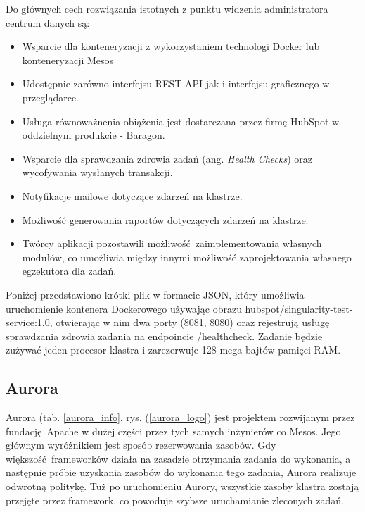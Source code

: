 \documentclass[10pt,a4paper,titlepage,twoside]{report}
\begin{document}
Do głównych cech rozwiązania istotnych z punktu widzenia administratora centrum danych są:
\begin{itemize}
\item Wsparcie dla konteneryzacji z wykorzystaniem technologi Docker lub konteneryzacji Mesos
\item Udostępnie zarówno interfejsu REST API jak i interfejsu graficznego w przeglądarce. 
\item Usługa równoważnenia obiążenia jest dostarczana przez firmę HubSpot w oddzielnym produkcie - Baragon.
\item Wsparcie dla sprawdzania zdrowia zadań (ang. \textit{Health Checks}) oraz wycofywania wysłanych transakcji.
\item Notyfikacje mailowe dotyczące zdarzeń na klastrze.
\item Możliwość generowania raportów dotyczących zdarzeń na klastrze.
\item Twórcy aplikacji pozostawili możliwość zaimplementowania własnych modułów, co umożliwia między innymi możliwość zaprojektowania własnego egzekutora dla zadań. 
\end{itemize}

Poniżej przedstawiono krótki plik w formacie JSON, który umożliwia uruchomienie kontenera Dockerowego używając obrazu hubspot/singularity-test-service:1.0, otwierając w nim dwa porty (8081, 8080) oraz rejestrują usługę sprawdzania zdrowia zadania na endpoincie /healthcheck. Zadanie będzie zużywać jeden procesor klastra i zarezerwuje 128 mega bajtów pamięci RAM.



\subsection{Aurora}
Aurora (tab. \ref{aurora_info}, rys. (\ref{aurora_logo}) jest projektem rozwijanym przez fundację Apache w dużej części przez tych samych inżynierów co Mesos. Jego głównym wyróżnikiem jest sposób rezerwowania zasobów. Gdy większość frameworków działa na zasadzie otrzymania zadania do wykonania, a następnie próbie uzyskania zasobów do wykonania tego zadania, Aurora realizuje odwrotną politykę. Tuż po uruchomieniu Aurory, wszystkie zasoby klastra zostają przejęte przez framework, co powoduje szybsze uruchamianie zleconych zadań.
\end{document}

